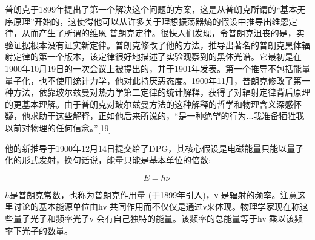 普朗克于1899年提出了第一个解决这个问题的方案，这是从普朗克所谓的“基本无序原理”开始的，这使得他可以从许多关于理想振荡器熵的假设中推导出维恩定律，从而产生了所谓的维恩-普朗克定律。很快人们发现，令普朗克沮丧的是，实验证据根本没有证实新定律。普朗克修改了他的方法，推导出著名的普朗克黑体辐射定律的第一个版本，该定律很好地描述了实验观察到的黑体光谱。它最初是在1900年10月19日的一次会议上被提出的，并于1901年发表。第一个推导不包括能量量子化，也不使用统计力学，他对此持厌恶态度。1900年11月，普朗克修改了第一种方法，依靠玻尔兹曼对热力学第二定律的统计解释，获得了对辐射定律背后原理的更基本理解。由于普朗克对玻尔兹曼方法的这种解释的哲学和物理含义深感怀疑，他求助于这些解释，正如他后来所说的，“是一种绝望的行为...我准备牺牲我以前对物理的任何信念。”[19]

他的新推导于1900年12月14日提交给了DPG，其核心假设是电磁能量只能以量子化的形式发射，换句话说，能量只能是基本单位的倍数:

$$E=hν~$$

$h$是普朗克常数，也称为普朗克作用量 (于1899年引入)，ν 是辐射的频率。注意这里讨论的基本能源单位由hν 共同作用而不仅仅是通过ν来体现。物理学家现在称这些量子光子和频率光子ν 会有自己独特的能量。该频率的总能量等于hν 乘以该频率下光子的数量。